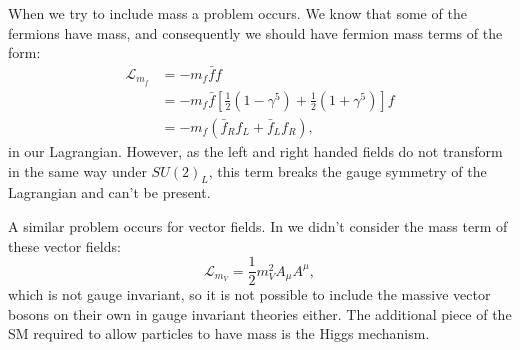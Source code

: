When we try to include mass a problem occurs. We know that some of the fermions have mass, and consequently we should have fermion mass terms of the form:
\begin{equation}
  \begin{split}
    \mathcal{L}_{m_{f}}&=-m_{f}\bar{f}{f} \\
    &=-m_{f}\bar{f}\left[\frac{1}{2}\left(1-\gamma^{5}\right)+\frac{1}{2}\left(1+\gamma^{5}\right)\right]f \\
    &=-m_{f}\left(\bar{f}_{R}f_{L}+\bar{f}_{L}f_{R}\right),
  \end{split}
\end{equation}
in our Lagrangian. However, as the left and right handed fields do not transform in the same way under $SU\left(2\right)_{L}$, this term breaks the gauge symmetry of the Lagrangian and can't be present. 

A similar problem occurs for vector fields. In  we didn't consider the mass term of these vector fields:
\begin{equation}
  \label{eq:vectorlagrangian}
  \mathcal{L}_{m_V}=\frac{1}{2}m_{V}^{2}A_{\mu}A^{\mu},
\end{equation}
which is not gauge invariant, so it is not possible to include the massive vector bosons on their own in gauge invariant theories either. The additional piece of the SM required to allow particles to have mass is the Higgs mechanism.

